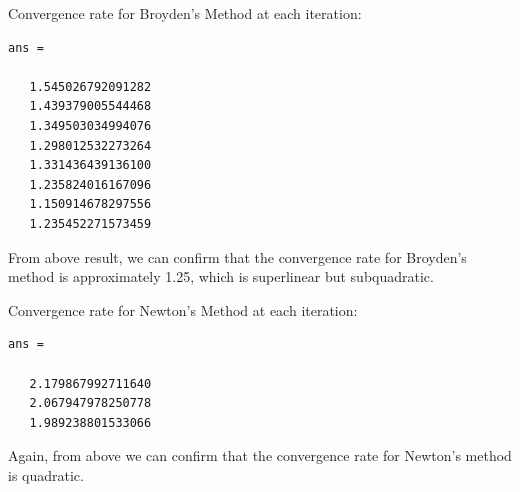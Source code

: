 \documentclass[11pt]{amsart}
\begin{document}
Convergence rate for Broyden's Method at each iteration:
\begin{lstlisting}
ans =

   1.545026792091282
   1.439379005544468
   1.349503034994076
   1.298012532273264
   1.331436439136100
   1.235824016167096
   1.150914678297556
   1.235452271573459
\end{lstlisting}
From above result, we can confirm that the convergence rate for Broyden's method is approximately 1.25, which is superlinear but subquadratic. 

Convergence rate for Newton's Method at each iteration:
\begin{lstlisting}
ans =

   2.179867992711640
   2.067947978250778
   1.989238801533066
\end{lstlisting}
Again, from above we can confirm that the convergence rate for Newton's method is quadratic. 
\end{document}

